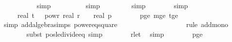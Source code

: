 \begin{isabellebody}
\ \ \ \ \ \ \ \ \ \isamarkupfalse%
\ simp\isanewline
\ \ \ \ \ \ \ \ \isamarkupfalse%
\ simp\isanewline
\ \ \ \ \ \ \ \isamarkupfalse%
\ simp\isanewline
\ \ \ \ \ \ \isamarkupfalse%
\ simp\ \isanewline
\ \ \ \ \isamarkupfalse%
\ \isamarkupfalse%
\ {\isachardoublequoteopen}{\isachardot}{\kern0pt}{\isachardot}{\kern0pt}{\isachardot}{\kern0pt}\ {\isacharequal}{\kern0pt}\ {}{}\ {\isacharasterisk}{\kern0pt}\ {\isacharparenleft}{\kern0pt}real\ t{\isacharparenright}{\kern0pt}\ {\isacharasterisk}{\kern0pt}\ {\isacharparenleft}{\kern0pt}{}\ powr\ {\isacharminus}{\kern0pt}real\ r{\isacharparenright}{\kern0pt}\ {\isacharplus}{\kern0pt}\ {}\ {\isacharslash}{\kern0pt}\ real\ p{\isachardoublequoteclose}\isanewline
\ \ \ \ \ \ \isamarkupfalse%
\ p{\isacharunderscore}{\kern0pt}ge{\isacharunderscore}{\kern0pt}{}\ m{\isacharunderscore}{\kern0pt}ge{\isacharunderscore}{\kern0pt}{}\ t{\isacharunderscore}{\kern0pt}ge{\isacharunderscore}{\kern0pt}{}\ \isamarkupfalse%
\ {\isacharparenleft}{\kern0pt}simp\ add{\isacharcolon}{\kern0pt}algebra{\isacharunderscore}{\kern0pt}simps\ power{}{\isacharunderscore}{\kern0pt}eq{\isacharunderscore}{\kern0pt}square{\isacharparenright}{\kern0pt}\isanewline
\ \ \ \ \isamarkupfalse%
\ \isamarkupfalse%
\ {\isachardoublequoteopen}{\isachardot}{\kern0pt}{\isachardot}{\kern0pt}{\isachardot}{\kern0pt}\ {\isasymle}\ {}{\isacharslash}{\kern0pt}{}{}\ {\isacharplus}{\kern0pt}\ {}{\isacharslash}{\kern0pt}{}{}{\isachardoublequoteclose}\isanewline
\ \ \ \ \ \ \isamarkupfalse%
\ {\isacharparenleft}{\kern0pt}rule\ add{\isacharunderscore}{\kern0pt}mono{\isacharparenright}{\kern0pt}\isanewline
\ \ \ \ \ \ \isamarkupfalse%
\ {\isacharparenleft}{\kern0pt}subst\ pos{\isacharunderscore}{\kern0pt}le{\isacharunderscore}{\kern0pt}divide{\isacharunderscore}{\kern0pt}eq{\isacharcomma}{\kern0pt}\ simp{\isacharparenright}{\kern0pt}\isanewline
\ \ \ \ \ \ \isamarkupfalse%
\ r{\isacharunderscore}{\kern0pt}le{\isacharunderscore}{\kern0pt}t{}\ \isamarkupfalse%
\ simp\isanewline
\ \ \ \ \ \ \isamarkupfalse%
\ p{\isacharunderscore}{\kern0pt}ge{\isacharunderscore}{\kern0pt}{}{}\ \isamarkupfalse%

\end{isabellebody}
